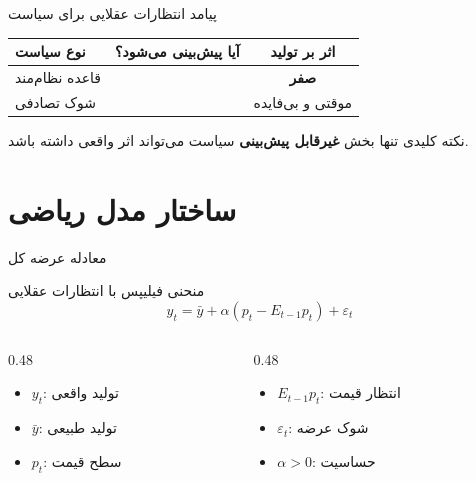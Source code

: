 \documentclass[aspectratio=169,11pt]{beamer}
\newcommand{\important}[1]{\textcolor{AlertRed}{\textbf{#1}}}
\begin{document}
\begin{frame}{پیامد انتظارات عقلایی برای سیاست}
	\begin{center}
		\renewcommand{\arraystretch}{1.5}
		\begin{tabular}{lcc}
			\toprule
			\textbf{نوع سیاست} & \textbf{آیا پیش‌بینی می‌شود؟} & \textbf{اثر بر تولید} \\
			\midrule
			قاعده نظام‌مند      & \faCheckCircle              & \important{صفر}       \\
			شوک تصادفی         & \faTimesCircle              & موقتی و بی‌فایده       \\
			\bottomrule
		\end{tabular}
	\end{center}
	\vspace{0.5cm}
	\begin{alertblock}{نکته کلیدی}
		تنها بخش \important{غیرقابل پیش‌بینی} سیاست می‌تواند اثر واقعی داشته باشد.
	\end{alertblock}
\end{frame}

\section{ساختار مدل ریاضی}

\begin{frame}{معادله عرضه کل}
	\begin{block}{منحنی فیلیپس با انتظارات عقلایی}
		\centering
		\large
		\[
			y_t = \bar{y} + \alpha (p_t - E_{t-1}p_t) + \varepsilon_t
		\]
	\end{block}
	\vspace{0.2cm}
	\begin{LTR}
		\begin{columns}[T]
			\begin{column}{0.48\textwidth}
				\begin{RTL}
					\begin{itemize}
						\item $y_t$: تولید واقعی
						\item $\bar{y}$: تولید طبیعی
						\item $p_t$: سطح قیمت
					\end{itemize}
				\end{RTL}
			\end{column}
			\hfill
			\begin{column}{0.48\textwidth}
				\begin{RTL}
					\begin{itemize}
						\item $E_{t-1}p_t$: انتظار قیمت
						\item $\varepsilon_t$: شوک عرضه
						\item $\alpha > 0$: حساسیت
					\end{itemize}
				\end{RTL}
			\end{column}
		\end{columns}
	\end{LTR}
\end{frame}
\end{document}
